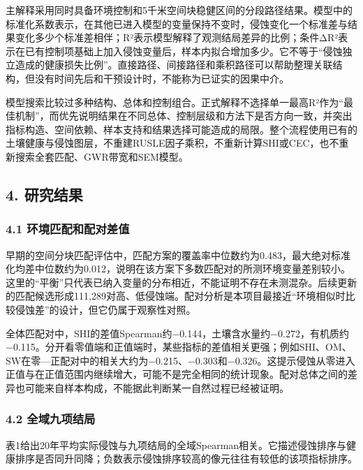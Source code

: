 \documentclass[
  10.5pt,
]{article}
\begin{document}
主解释采用同时具备环境控制和5千米空间块稳健区间的分段路径结果。模型中的标准化系数表示，在其他已进入模型的变量保持不变时，侵蚀变化一个标准差与结果变化多少个标准差相伴；R²表示模型解释了观测结局差异的比例；条件ΔR²表示在已有控制项基础上加入侵蚀变量后，样本内拟合增加多少。它不等于``侵蚀独立造成的健康损失比例''。直接路径、间接路径和乘积路径可以帮助整理关联结构，但没有时间先后和干预设计时，不能称为已证实的因果中介。

模型搜索比较过多种结构、总体和控制组合。正式解释不选择单一最高R²作为``最佳机制''，而优先说明结果在不同总体、控制层级和方法下是否方向一致，并突出指标构造、空间依赖、样本支持和结果选择可能造成的局限。整个流程使用已有的土壤健康与侵蚀图层，不重建RUSLE因子乘积，不重新计算SHI或CEC，也不重新搜索全套匹配、GWR带宽和SEM模型。

\hypertarget{ux7814ux7a76ux7ed3ux679c}{%
\subsection{4. 研究结果}\label{ux7814ux7a76ux7ed3ux679c}}

\hypertarget{ux73afux5883ux5339ux914dux548cux914dux5bf9ux5deeux503c}{%
\subsubsection{4.1
环境匹配和配对差值}\label{ux73afux5883ux5339ux914dux548cux914dux5bf9ux5deeux503c}}

早期的空间分块匹配评估中，匹配方案的覆盖率中位数约为0.483，最大绝对标准化均差中位数约为0.012，说明在该方案下多数匹配对的所测环境变量差别较小。这里的``平衡''只代表已纳入变量的分布相近，不能证明不存在未测混杂。后续更新的匹配候选形成111,289对高、低侵蚀端。配对分析是本项目最接近``环境相似时比较侵蚀差''的设计，但它仍属于观察性对照。

全体匹配对中，SHI的差值Spearman约−0.144，土壤含水量约−0.272，有机质约−0.115。分开看零值端和正值端时，某些指标的差值相关更强；例如SHI、OM、SW在零---正配对中的相关大约为−0.215、−0.303和−0.326。这提示侵蚀从零进入正值与在正值范围内继续增大，可能不是完全相同的统计现象。配对总体之间的差异也可能来自样本构成，不能据此判断某一自然过程已经被证明。

\hypertarget{ux5168ux57dfux4e5dux9879ux7ed3ux5c40}{%
\subsubsection{4.2
全域九项结局}\label{ux5168ux57dfux4e5dux9879ux7ed3ux5c40}}

表1给出20年平均实际侵蚀与九项结局的全域Spearman相关。它描述侵蚀排序与健康排序是否同升同降；负数表示侵蚀排序较高的像元往往有较低的该项指标排序。
\end{document}
